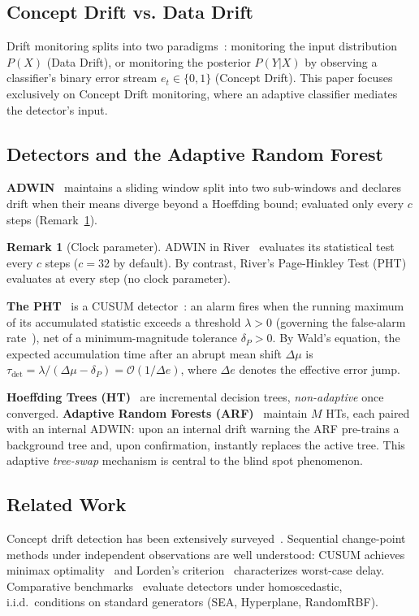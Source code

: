 \documentclass[10pt,conference]{IEEEtran}
\theoremstyle{definition}
\newtheorem{remark}[theorem]{Remark}
\begin{document}
\subsection{Concept Drift vs. Data Drift}
Drift monitoring splits into two paradigms~\cite{gama_survey_2014, lu_concept_drift_2018}: monitoring the input distribution $P(X)$ (Data Drift), or monitoring the posterior $P(Y|X)$ by observing a classifier's binary error stream $e_t \in \{0,1\}$ (Concept Drift). This paper focuses exclusively on Concept Drift monitoring, where an adaptive classifier mediates the detector's input.

\subsection{Detectors and the Adaptive Random Forest}\label{sec:adwin}
\textbf{ADWIN}~\cite{bifet_adwin_2007} maintains a sliding window split into two sub-windows and declares drift when their means diverge beyond a Hoeffding bound; evaluated only every $c$ steps (Remark~\ref{rem:clock}).

\begin{remark}[Clock parameter]\label{rem:clock}
  ADWIN in River~\cite{montiel_river_2021} evaluates its statistical test every $c$ steps ($c=32$ by default). By contrast, River's Page-Hinkley Test (PHT) evaluates at every step (no clock parameter).
\end{remark}

\noindent\textbf{The PHT}~\cite{page_1954} is a CUSUM detector~\cite{basseville_1993}: an alarm fires when the running maximum of its accumulated statistic exceeds a threshold $\lambda > 0$ (governing the false-alarm rate~\cite{tartakovsky_2014}), net of a minimum-magnitude tolerance $\delta_P > 0$. By Wald's equation, the expected accumulation time after an abrupt mean shift $\Delta\mu$ is $\tau_{\mathrm{det}} = \lambda / (\Delta\mu - \delta_P) = \mathcal{O}(1/\Delta e)$, where $\Delta e$ denotes the effective error jump.

\noindent\textbf{Hoeffding Trees (HT)}~\cite{gama_survey_2014} are incremental decision trees, \emph{non-adaptive} once converged. \textbf{Adaptive Random Forests (ARF)}~\cite{gomes_arf_2017} maintain $M$ HTs, each paired with an internal ADWIN: upon an internal drift warning the ARF pre-trains a background tree and, upon confirmation, instantly replaces the active tree. This adaptive \emph{tree-swap} mechanism is central to the blind spot phenomenon.

\subsection{Related Work}\label{sec:related}
Concept drift detection has been extensively surveyed~\cite{gama_survey_2014, lu_concept_drift_2018}.
Sequential change-point methods under independent observations are well understood: CUSUM achieves minimax optimality~\cite{moustakides_1986} and Lorden's criterion~\cite{lorden_1971} characterizes worst-case delay.
Comparative benchmarks~\cite{goncalves_2014, lukats_2025} evaluate detectors under homoscedastic, i.i.d.\ conditions on standard generators (SEA, Hyperplane, RandomRBF).
\end{document}
